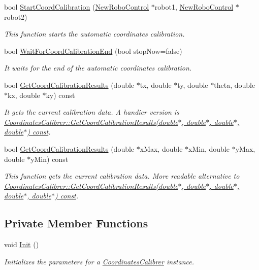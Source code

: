 \begin{DoxyCompactItemize}
bool \hyperlink{classCoordinatesCalibrer_a2087994adbb8651efcb06e3d7a2315da}{StartCoordCalibration} (\hyperlink{classNewRoboControl}{NewRoboControl} $\ast$robot1, \hyperlink{classNewRoboControl}{NewRoboControl} $\ast$robot2)
\begin{DoxyCompactList}\small\item\em This function starts the automatic coordinates calibration. \item\end{DoxyCompactList}\item 
bool \hyperlink{classCoordinatesCalibrer_a99563ba6e43f839bf1b10f55cf155125}{WaitForCoordCalibrationEnd} (bool stopNow=false)
\begin{DoxyCompactList}\small\item\em It waits for the end of the automatic coordinates calibration. \item\end{DoxyCompactList}\item 
bool \hyperlink{classCoordinatesCalibrer_a92672252bda26bddd9b8c73bc6395ea3}{GetCoordCalibrationResults} (double $\ast$tx, double $\ast$ty, double $\ast$theta, double $\ast$kx, double $\ast$ky) const 
\begin{DoxyCompactList}\small\item\em It gets the current calibration data. A handier version is \hyperlink{classCoordinatesCalibrer_a1a3ae703556c2f4c4455792a43fed987}{CoordinatesCalibrer::GetCoordCalibrationResults(double$\ast$, double$\ast$, double$\ast$, double$\ast$) const}. \item\end{DoxyCompactList}\item 
bool \hyperlink{classCoordinatesCalibrer_a1a3ae703556c2f4c4455792a43fed987}{GetCoordCalibrationResults} (double $\ast$xMax, double $\ast$xMin, double $\ast$yMax, double $\ast$yMin) const 
\begin{DoxyCompactList}\small\item\em This function gets the current calibration data. More readable alternative to \hyperlink{classCoordinatesCalibrer_a92672252bda26bddd9b8c73bc6395ea3}{CoordinatesCalibrer::GetCoordCalibrationResults(double$\ast$, double$\ast$, double$\ast$, double$\ast$, double$\ast$) const}. \item\end{DoxyCompactList}\end{DoxyCompactItemize}
\subsection*{Private Member Functions}
\begin{DoxyCompactItemize}
\item 
void \hyperlink{classCoordinatesCalibrer_a19faab9e443f7ef64462a36c19baf6bc}{Init} ()
\begin{DoxyCompactList}\small\item\em Initializes the parameters for a \hyperlink{classCoordinatesCalibrer}{CoordinatesCalibrer} instance. \item\end{DoxyCompactList}\end{DoxyCompactItemize}
